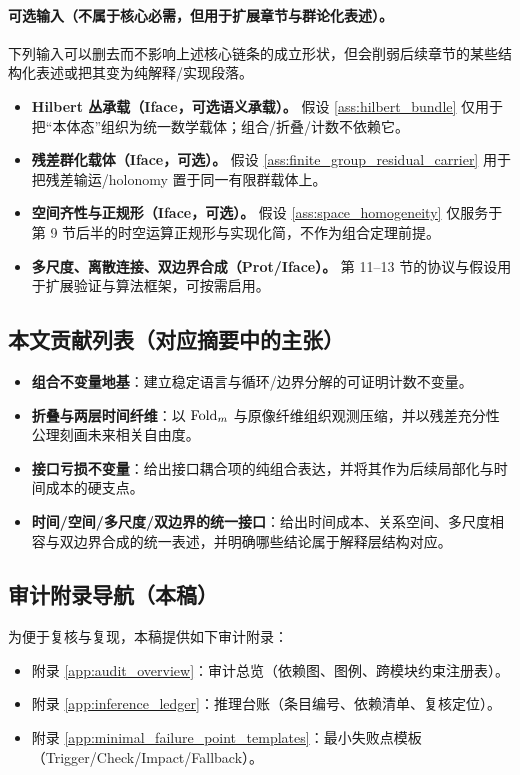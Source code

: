 \paragraph{可选输入（不属于核心必需，但用于扩展章节与群论化表述）。}
\AuditTag 下列输入可以删去而不影响上述核心链条的成立形状，但会削弱后续章节的某些结构化表述或把其变为纯解释/实现段落。
\begin{itemize}
  \item \textbf{Hilbert 丛承载（Iface，可选语义承载）。} 假设 \ref{ass:hilbert_bundle} 仅用于把“本体态”组织为统一数学载体；组合/折叠/计数不依赖它。
  \item \textbf{残差群化载体（Iface，可选）。} 假设 \ref{ass:finite_group_residual_carrier} 用于把残差输运/holonomy 置于同一有限群载体上。
  \item \textbf{空间齐性与正规形（Iface，可选）。} 假设 \ref{ass:space_homogeneity} 仅服务于第 9 节后半的时空运算正规形与实现化简，不作为组合定理前提。
  \item \textbf{多尺度、离散连接、双边界合成（Prot/Iface）。} 第 11--13 节的协议与假设用于扩展验证与算法框架，可按需启用。
\end{itemize}

\subsection{本文贡献列表（对应摘要中的主张）}

\begin{itemize}
  \item \textbf{组合不变量地基}：建立稳定语言与循环/边界分解的可证明计数不变量。
  \item \textbf{折叠与两层时间纤维}：以 $\mathrm{Fold}_m$ 与原像纤维组织观测压缩，并以残差充分性公理刻画未来相关自由度。
  \item \textbf{接口亏损不变量}：给出接口耦合项的纯组合表达，并将其作为后续局部化与时间成本的硬支点。
  \item \textbf{时间/空间/多尺度/双边界的统一接口}：给出时间成本、关系空间、多尺度相容与双边界合成的统一表述，并明确哪些结论属于解释层结构对应。
\end{itemize}

\subsection{审计附录导航（本稿）}

\AuditTag 为便于复核与复现，本稿提供如下审计附录：
\begin{itemize}
  \item 附录 \ref{app:audit_overview}：审计总览（依赖图、图例、跨模块约束注册表）。
  \item 附录 \ref{app:inference_ledger}：推理台账（条目编号、依赖清单、复核定位）。
  \item 附录 \ref{app:minimal_failure_point_templates}：最小失败点模板（Trigger/Check/Impact/Fallback）。
\end{itemize}

